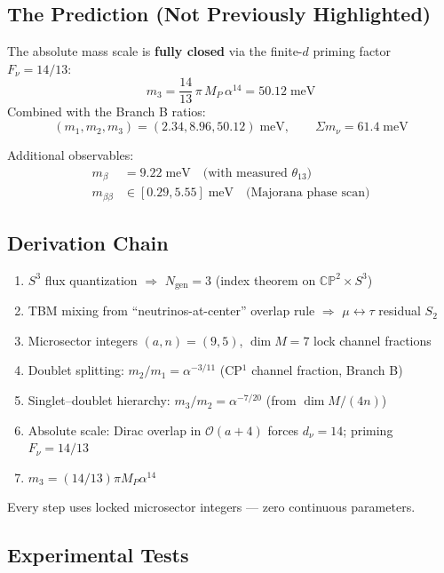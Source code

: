 \documentclass[11pt]{article}
\begin{document}
\subsection{The Prediction (Not Previously Highlighted)}

The absolute mass scale is \textbf{fully closed} via the finite-$d$ priming factor $F_\nu = 14/13$:
\begin{equation}
\boxed{m_3 = \frac{14}{13}\,\pi\,M_P\,\alpha^{14} = 50.12\;\text{meV}}
\end{equation}
Combined with the Branch B ratios:
\begin{equation}
(m_1, m_2, m_3) = (2.34, 8.96, 50.12)\;\text{meV}, \qquad \boxed{\Sigma m_\nu = 61.4\;\text{meV}}
\end{equation}

Additional observables:
\begin{align}
m_\beta &= 9.22\;\text{meV}\quad\text{(with measured $\theta_{13}$)} \\
m_{\beta\beta} &\in [0.29, 5.55]\;\text{meV}\quad\text{(Majorana phase scan)}
\end{align}

\subsection{Derivation Chain}

\begin{enumerate}
\item $S^3$ flux quantization $\Rightarrow$ $N_\text{gen} = 3$ (index theorem on $\mathbb{CP}^2 \times S^3$)
\item TBM mixing from ``neutrinos-at-center'' overlap rule $\Rightarrow$ $\mu\leftrightarrow\tau$ residual $S_2$
\item Microsector integers $(a,n) = (9,5)$, $\dim M = 7$ lock channel fractions
\item Doublet splitting: $m_2/m_1 = \alpha^{-3/11}$ (CP$^1$ channel fraction, Branch B)
\item Singlet--doublet hierarchy: $m_3/m_2 = \alpha^{-7/20}$ (from $\dim M / (4n)$)
\item Absolute scale: Dirac overlap in $\mathcal{O}(a+4)$ forces $d_\nu = 14$; priming $F_\nu = 14/13$
\item $m_3 = (14/13)\pi M_P \alpha^{14}$
\end{enumerate}

\noindent Every step uses locked microsector integers --- zero continuous parameters.

\subsection{Experimental Tests}
\end{document}

